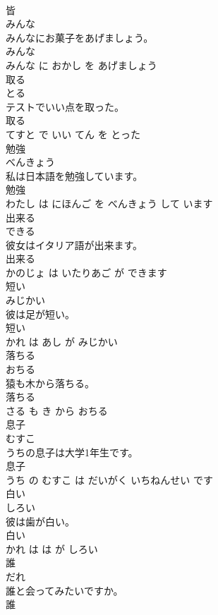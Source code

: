\documentclass[8pt]{extreport}
\begin{document}
\begin{CJK}{UTF8}{min}
\\	皆	
\\	みんな			
\\	みんなにお菓子をあげましょう。	
\\	みんな 
\\	みんな に おかし を あげましょう			
\\	取る	
\\	とる			
\\	テストでいい点を取った。	
\\	取る 
\\	てすと で いい てん を とった			
\\	勉強	
\\	べんきょう			
\\	私は日本語を勉強しています。	
\\	勉強 
\\	わたし は にほんご を べんきょう して います			
\\	出来る	
\\	できる			
\\	彼女はイタリア語が出来ます。	
\\	出来る 
\\	かのじょ は いたりあご が できます			
\\	短い	
\\	みじかい			
\\	彼は足が短い。	
\\	短い 
\\	かれ は あし が みじかい			
\\	落ちる	
\\	おちる			
\\	猿も木から落ちる。	
\\	落ちる 
\\	さる も き から おちる			
\\	息子	
\\	むすこ			
\\	うちの息子は大学1年生です。	
\\	息子 
\\	うち の むすこ は だいがく いちねんせい です			
\\	白い	
\\	しろい			
\\	彼は歯が白い。	
\\	白い 
\\	かれ は は が しろい			
\\	誰	
\\	だれ			
\\	誰と会ってみたいですか。	
\\	誰 

\end{CJK}
\end{document}
